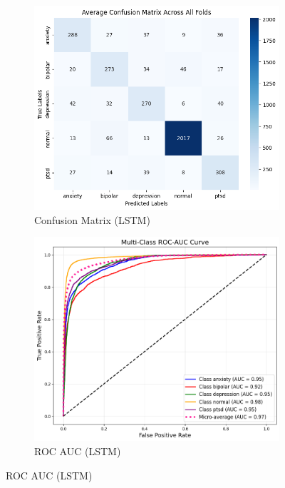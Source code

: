 \pagebreak

\begin{figure}[h!]
    \centering
    \begin{subfigure}[b]{0.49\textwidth}
        \centering
        \includegraphics[width=\textwidth]{Images/LSTM Confusion Matrix.png}
        \caption*{Confusion Matrix (LSTM)}
        \label{LSTMCM}  %
    \end{subfigure}
    \hfill
    \begin{subfigure}[b]{0.49\textwidth}
        \centering
        \includegraphics[width=\textwidth]{Images/LSTM ROC.png}
        \caption*{ROC AUC (LSTM)}
        \label{LSTMROC}  %
    \end{subfigure}
    \label{fig:lstm_comparison}
\end{figure}


